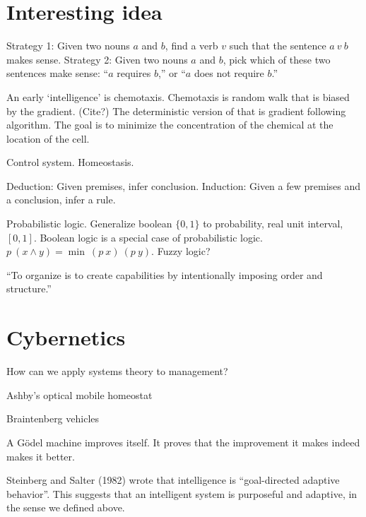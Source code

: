 \section{Interesting idea}

Strategy 1:
Given two nouns \(a\) and \(b\), find a verb \(v\) such that the sentence \(a~v~b\) makes sense.
Strategy 2:
Given two nouns \(a\) and \(b\), pick which of these two sentences make sense:
``\(a\) requires \(b\),'' or ``\(a\) does not require \(b\).''

An early `intelligence' is chemotaxis.
Chemotaxis is random walk that is biased by the gradient. (Cite?)
The deterministic version of that is gradient following algorithm.
The goal is to minimize the concentration of the chemical at the location of the cell.

Control system. Homeostasis.

Deduction: Given premises, infer conclusion.
Induction: Given a few premises and a conclusion, infer a rule.

Probabilistic logic.
Generalize boolean \(\{0,1\}\) to probability, real unit interval, \([0,1]\).
Boolean logic is a special case of probabilistic logic.
\(p~(x \wedge y) = \min~(p~x)~(p~y)\).
Fuzzy logic?

``To organize is to create capabilities by intentionally imposing order and structure.'' \cite{Organ}

\section{Cybernetics}

How can we apply systems theory to management? \cite{SystemManage}

Ashby's optical mobile homeostat
\cite{BattleHom}
\cite{BattleThree}

Braintenberg vehicles

A G\"odel machine improves itself.
It proves that the improvement it makes indeed makes it better.
\cite{GodelMachImpl}


Steinberg and Salter (1982)
wrote that intelligence is ``goal-directed adaptive behavior''.
This suggests that an intelligent system is purposeful and adaptive,
in the sense we defined above.


